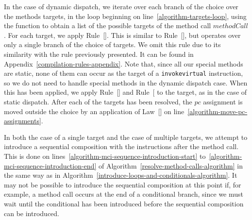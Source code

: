 In the case of dynamic dispatch, we iterate over each branch of the
choice over the methods targets, in the loop beginning on
line~\ref{algorithm-targets-loop}, using the function
 to obtain a list of the possible targets
of the method call $methodCall$.
For each target, we apply
Rule~[].
This is similar to Rule~[], but
operates over only a single branch of the choice of targets.
We omit this rule due to its similarity with the rule previously
presented.
It can be found in Appendix~\ref{compilation-rules-appendix}.
Note that, since all our special methods are static, none of them can
occur as the target of a \texttt{invokevirtual} instruction, so we do
not need to handle special methods in the dynamic dispatch case. 
When this has been applied, we apply
Rule~[]
and
Rule~[
to the target, as in the case of static dispatch.
After each of the targets has been resolved, the $pc$ assignment is
moved outside the choice by an application of
Law~[] on
line~\ref{algorithm-move-pc-assignments}.

In both the case of a single target and the case of multiple targets,
we attempt to introduce a sequential composition with the instructions
after the method call.
This is done on lines~\ref{algorithm-mci-sequence-introduction-start}
to~\ref{algorithm-mci-sequence-introduction-end} of
Algorithm~\ref{resolve-method-calls-algorithm} in the same way as in
Algorithm~\ref{introduce-loops-and-conditionals-algorithm}.
It may not be possible to introduce the sequential composition at this
point if, for example, a method call occurs at the end of a
conditional branch, since we must wait until the conditional has been
introduced before the sequential composition can be introduced.

